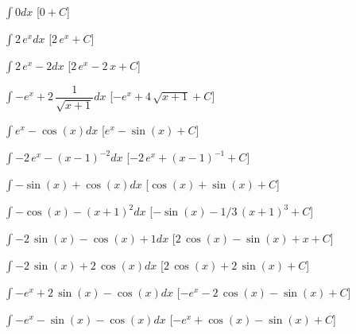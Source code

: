 \begin{esercizio}\label{ese: 3}
 \begin{enumeratea}
\item $\int 0 dx$ 
\hfill [$0 + C$]
\item $\int 2\,{{e}^{x}} dx$ 
\hfill [$2\,{{e}^{x}} + C$]
\item $\int 2\,{{e}^{x}}-2 dx$ 
\hfill [$2\,{{e}^{x}}-2\,x + C$]
\item $\int -{{e}^{x}}+2\,{\dfrac {1}{\sqrt {x+1}}} dx$ 
\hfill [$-{{e}^{x}}+4\,\sqrt {x+1} + C$]
\item $\int {{e}^{x}}-\cos \left( x \right)  dx$ 
\hfill [${{e}^{x}}-\sin \left( x \right)  + C$]
\item $\int -2\,{{e}^{x}}- \left( x-1 \right) ^{-2} dx$ 
\hfill [$-2\,{{e}^{x}}+ \left( x-1 \right) ^{-1} + C$]
\item $\int -\sin \left( x \right) +\cos \left( x \right)  dx$ 
\hfill [$\cos \left( x \right) +\sin \left( x \right)  + C$]
\item $\int -\cos \left( x \right) - \left( x+1 \right) ^{2} dx$ 
\hfill [$-\sin \left( x \right) -1/3\, \left( x+1 \right) ^{3} + C$]
\item $\int -2\,\sin \left( x \right) -\cos \left( x \right) +1 dx$ 
\hfill [$2\,\cos \left( x \right) -\sin \left( x \right) +x + C$]
\item $\int -2\,\sin \left( x \right) +2\,\cos \left( x \right)  dx$ 
\hfill [$2\,\cos \left( x \right) +2\,\sin \left( x \right)  + C$]
\item $\int -{{e}^{x}}+2\,\sin \left( x \right) -\cos \left( x \right)dx$ 
\hfill [$-{{e}^{x}}-2\,\cos \left( x \right) -\sin \left( x \right) +C$]
\item $\int -{{e}^{x}}-\sin \left( x \right) -\cos \left( x \right)  dx$ 
\hfill [$-{{e}^{x}}+\cos \left( x \right) -\sin \left( x \right)  + C$]
 \end{enumeratea}
\end{esercizio}

\begin{comment}
 
\begin{esercizio}\label{ese:03.1}
 \begin{enumeratea}
 \end{enumeratea}
\end{esercizio}

\end{comment}

